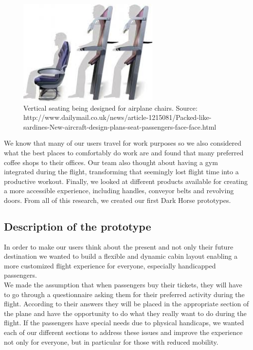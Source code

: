 \begin{figure}[h]
  \centering
     \includegraphics[width=7cm]{images/vertical_seating.jpg}
   \caption{Vertical seating being designed for airplane chairs. Source: http://www.dailymail.co.uk/news/article-1215081/Packed-like-sardines-New-aircraft-design-plans-seat-passengers-face-face.html}
  \label{fig:vertical_seating.jpg}
\end{figure} 

We know that many of our users travel for work purposes so we also considered what the best places to comfortably do work are and found that many preferred coffee shops to their offices. Our team also thought about having a gym integrated during the flight, transforming that seemingly lost flight time into a productive workout. Finally, we looked at different products available for creating a more accessible experience, including handles, conveyor belts and revolving doors. From all of this research, we created our first Dark Horse prototypes.

\subsection{Description of the prototype}
In order to make our users think about the present and not only their future destination we wanted to build a flexible and dynamic cabin layout enabling a more customized flight experience for everyone, especially handicapped passengers. \\

We made the assumption that when passengers buy their tickets, they will have to go through a questionnaire asking them for their preferred activity during the flight. According to their answers they will be placed in the appropriate section of the plane and have the opportunity to do what they really want to do during the flight. If the passengers have special needs due to physical handicaps, we wanted each of our different sections to address these issues and improve the experience not only for everyone, but in particular for those with reduced mobility. \\

